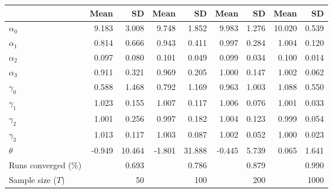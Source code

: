 
\begin{tabular}[t]{lrrrrrrrr}
\toprule
  & Mean & SD & Mean  & SD  & Mean   & SD   & Mean    & SD   \\
\midrule
$\alpha_{0}$ & 9.183 & 3.008 & 9.748 & 1.852 & 9.983 & 1.276 & 10.020 & 0.539\\
$\alpha_{1}$ & 0.814 & 0.666 & 0.943 & 0.411 & 0.997 & 0.284 & 1.004 & 0.120\\
$\alpha_{2}$ & 0.097 & 0.080 & 0.101 & 0.049 & 0.099 & 0.034 & 0.100 & 0.014\\
$\alpha_{3}$ & 0.911 & 0.321 & 0.969 & 0.205 & 1.000 & 0.147 & 1.002 & 0.062\\
$\gamma_{0}$ & 0.588 & 1.468 & 0.792 & 1.169 & 0.963 & 1.003 & 1.088 & 0.550\\
$\gamma_{1}$ & 1.023 & 0.155 & 1.007 & 0.117 & 1.006 & 0.076 & 1.001 & 0.033\\
$\gamma_{2}$ & 1.001 & 0.256 & 0.997 & 0.182 & 1.004 & 0.123 & 0.999 & 0.054\\
$\gamma_{3}$ & 1.013 & 0.117 & 1.003 & 0.087 & 1.002 & 0.052 & 1.000 & 0.023\\
$\theta$ & -0.949 & 10.464 & -1.801 & 31.888 & -0.445 & 5.739 & 0.065 & 1.641\\
Runs converged (\%) &  & 0.693 &  & 0.786 &  & 0.879 &  & 0.990\\
Sample size ($T$) &  & 50 &  & 100 &  & 200 &  & 1000\\
\bottomrule
\end{tabular}
